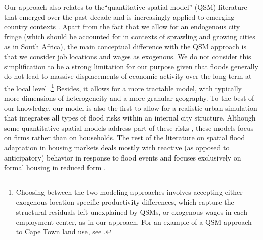 \documentclass[12pt]{article}
\begin{document}


Our approach also relates to the``quantitative spatial model'' (QSM) literature that emerged over the past decade \citep{Redding2017QuantitativeEconomics} and is increasingly applied to emerging country contexts \citep{Sturm2023HowCountries}. Apart from the fact that we allow for an endogenous city fringe (which should be accounted for in contexts of sprawling and growing cities as in South Africa), the main conceptual difference with the QSM approach is that we consider job locations and wages as exogenous. We do not consider this simplification to be a strong limitation for our purpose given that floods generally do not lead to massive displacements of economic activity over the long term at the local level \citep{Kocornik-Mina2020FloodedCities}.\footnote{Choosing between the two modeling approaches involves accepting either exogenous location-specific productivity differences, which capture the structural residuals left unexplained by QSMs, or exogenous wages in each employment center, as in our approach. For an example of a QSM approach to Cape Town land use, see \citet{cole2025cities}.} Besides, it allows for a more tractable model, with typically more dimensions of heterogeneity and a more granular geography. To the best of our knowledge, our model is also the first to allow for a realistic urban simulation that integrates all types of flood risks within an internal city structure. Although some quantitative spatial models address part of these risks \citep{desmet,Balboni2025InCities, balboni_pakistan, jia}, these models focus on firms rather than on households. The rest of the literature on spatial flood adaptation in housing markets deals mostly with reactive (as opposed to anticipatory) behavior in response to flood events and focuses exclusively on formal housing in reduced form \citep{Ortega2018RisingMarket, Muller2019HurricaneRisk, Ellen2024HeterogeneitySandy}.

\end{document}
